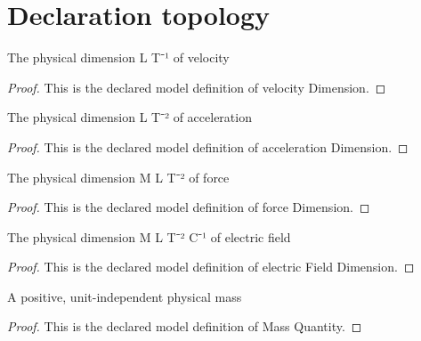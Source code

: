 \section{Declaration topology}
\begin{definition}
  \label{def:physics:phyx-mini-0909:phyxminiproblems-problemphyxmini0909-velocitydimension}
  The physical dimension L T⁻¹ of velocity
\end{definition}
\begin{proof}
  This is the declared model definition of velocity Dimension.
\end{proof}
\begin{definition}
  \label{def:physics:phyx-mini-0909:phyxminiproblems-problemphyxmini0909-accelerationdimension}
  The physical dimension L T⁻² of acceleration
\end{definition}
\begin{proof}
  This is the declared model definition of acceleration Dimension.
\end{proof}
\begin{definition}
  \label{def:physics:phyx-mini-0909:phyxminiproblems-problemphyxmini0909-forcedimension}
  The physical dimension M L T⁻² of force
\end{definition}
\begin{proof}
  This is the declared model definition of force Dimension.
\end{proof}
\begin{definition}
  \label{def:physics:phyx-mini-0909:phyxminiproblems-problemphyxmini0909-electricfielddimension}
  The physical dimension M L T⁻² C⁻¹ of electric field
\end{definition}
\begin{proof}
  This is the declared model definition of electric Field Dimension.
\end{proof}
\begin{definition}
  \label{def:physics:phyx-mini-0909:phyxminiproblems-problemphyxmini0909-massquantity}
  A positive, unit-independent physical mass
\end{definition}
\begin{proof}
  This is the declared model definition of Mass Quantity.
\end{proof}
